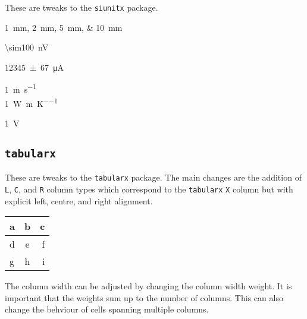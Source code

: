 \documentclass[10pt,titlepage]{article}
\newcommand*{\packagename}[1]{\texttt{#1}}
\newcommand*{\code}[1]{\texttt{#1}}
\begin{document}
These are tweaks to the \packagename{siunitx} package.

\begin{example}
\qtylist{1;2;5;10}{\mm}
\end{example}

\begin{example}
\qty{\sim100}{\nano\volt}
\end{example}

\begin{example}
\qty{12345(67)}{\micro\ampere}
\end{example}

\begin{example}
\qty{1}{\metre\per\second} \\
\qty{1}{\watt\per\metre\per\kelvin}
\end{example}

\begin{example}
\qty{1}{\volt\rms}
\end{example}


\subsection{\packagename{tabularx}}

These are tweaks to the \packagename{tabularx} package.
The main changes are the addition of \code{L}, \code{C}, and \code{R} column types
which correspond to the \packagename{tabularx} \code{X} column
but with explicit left, centre, and right alignment.

\begin{example}
\begin{tabularx}{\linewidth}{|L|C|R|}
  \toprule
  a & b & c \\
  \midrule
  d & e & f \\
  g & h & i \\
  \bottomrule
\end{tabularx}
\end{example}

The column width can be adjusted by changing the column width weight.
It is important that the weights sum up to the number of columns.
This can also change the behviour of cells spanning multiple columns.
\end{document}
